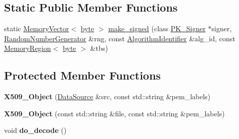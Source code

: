 \subsection*{Static Public Member Functions}
\begin{DoxyCompactItemize}
\item 
static \hyperlink{classBotan_1_1MemoryVector}{Memory\-Vector}$<$ \hyperlink{namespaceBotan_a7d793989d801281df48c6b19616b8b84}{byte} $>$ \hyperlink{classBotan_1_1X509__Object_a0388b935a82def1ee59cf3b25312f4e6}{make\-\_\-signed} (class \hyperlink{classBotan_1_1PK__Signer}{P\-K\-\_\-\-Signer} $\ast$signer, \hyperlink{classBotan_1_1RandomNumberGenerator}{Random\-Number\-Generator} \&rng, const \hyperlink{classBotan_1_1AlgorithmIdentifier}{Algorithm\-Identifier} \&alg\-\_\-id, const \hyperlink{classBotan_1_1MemoryRegion}{Memory\-Region}$<$ \hyperlink{namespaceBotan_a7d793989d801281df48c6b19616b8b84}{byte} $>$ \&tbs)
\end{DoxyCompactItemize}
\subsection*{Protected Member Functions}
\begin{DoxyCompactItemize}
\item 
\hypertarget{classBotan_1_1X509__Object_a2a7a5caafb1d6b45c8745d0d8c66c44a}{{\bfseries X509\-\_\-\-Object} (\hyperlink{classBotan_1_1DataSource}{Data\-Source} \&src, const std\-::string \&pem\-\_\-labels)}\label{classBotan_1_1X509__Object_a2a7a5caafb1d6b45c8745d0d8c66c44a}

\item 
\hypertarget{classBotan_1_1X509__Object_a56ca2d6a5faf7d59d65242ad9783ed3c}{{\bfseries X509\-\_\-\-Object} (const std\-::string \&file, const std\-::string \&pem\-\_\-labels)}\label{classBotan_1_1X509__Object_a56ca2d6a5faf7d59d65242ad9783ed3c}

\item 
\hypertarget{classBotan_1_1X509__Object_a0fa4b4549be3aec5b13056623575e62f}{void {\bfseries do\-\_\-decode} ()}\label{classBotan_1_1X509__Object_a0fa4b4549be3aec5b13056623575e62f}

\end{DoxyCompactItemize}

